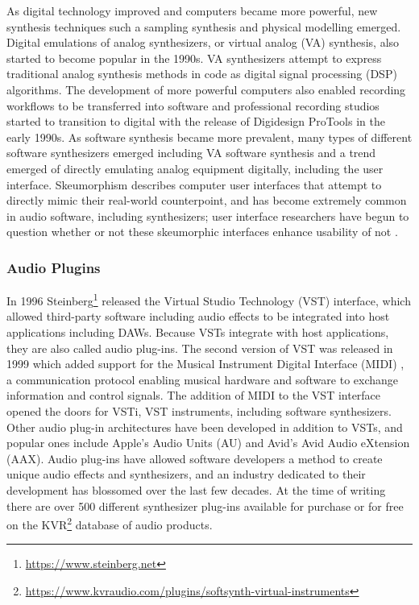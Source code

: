As digital technology improved and computers became more powerful, new synthesis techniques such a sampling synthesis \cite{mcguire2015musical} and physical modelling \cite{jaffe1983extensions} emerged. Digital emulations of analog synthesizers, or virtual analog (VA) synthesis, also started to become popular in the 1990s. VA synthesizers attempt to express traditional analog synthesis methods in code as digital signal processing (DSP) algorithms. The development of more powerful computers also enabled recording workflows to be transferred into software and professional recording studios started to transition to digital with the release of Digidesign ProTools in the early 1990s. As software synthesis became more prevalent, many types of different software synthesizers emerged including VA software synthesis and a trend emerged of directly emulating analog equipment digitally, including the user interface. Skeumorphism describes computer user interfaces that attempt to directly mimic their real-world counterpoint, and has become extremely common in audio software, including synthesizers; user interface researchers have begun to question whether or not these skeumorphic interfaces enhance usability of not \cite{lindh2018beyond}.

\subsubsection{Audio Plugins}
In 1996 Steinberg\footnote{\url{https://www.steinberg.net}} released the Virtual Studio Technology (VST) interface, which allowed third-party software including audio effects to be integrated into host applications including DAWs. Because VSTs integrate with host applications, they are also called audio plug-ins. The second version of VST was released in 1999 which added support for the Musical Instrument Digital Interface (MIDI) \cite{rothstein1992midi}, a communication protocol enabling musical hardware and software to exchange information and control signals. The addition of MIDI to the VST interface opened the doors for VSTi, VST instruments, including software synthesizers. Other audio plug-in architectures have been developed in addition to VSTs, and popular ones include Apple's Audio Units (AU) and Avid's Avid Audio eXtension (AAX). Audio plug-ins have allowed software developers a method to create unique audio effects and synthesizers, and an industry dedicated to their development has blossomed over the last few decades. At the time of writing there are over 500 different synthesizer plug-ins available for purchase or for free on the KVR\footnote{\url{https://www.kvraudio.com/plugins/softsynth-virtual-instruments}} database of audio products.

